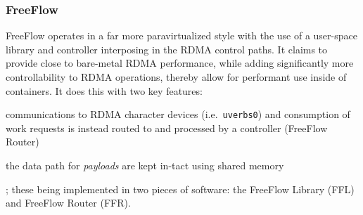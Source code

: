 \documentclass[12pt,titlepage]{article}
\begin{document}
\subsubsection{FreeFlow}
FreeFlow operates in a far more paravirtualized style with the use of a user-space library and controller interposing in the RDMA control paths.
It claims to provide close to bare-metal RDMA performance, while adding significantly more controllability to RDMA operations, thereby allow for performant use inside of containers.
It does this with two key features:
\begin{enumerate*}[label={(\arabic*)},itemjoin*={{, and }},itemjoin={{, }}]
	\item communications to RDMA character devices (i.e.\ \texttt{uverbs0}) and consumption of work requests is instead routed to and processed by a controller (FreeFlow Router)
	\item the data path for \textit{payloads} are kept in-tact using shared memory
\end{enumerate*};
these being implemented in two pieces of software: the FreeFlow Library (FFL) and FreeFlow Router (FFR).
\end{document}

